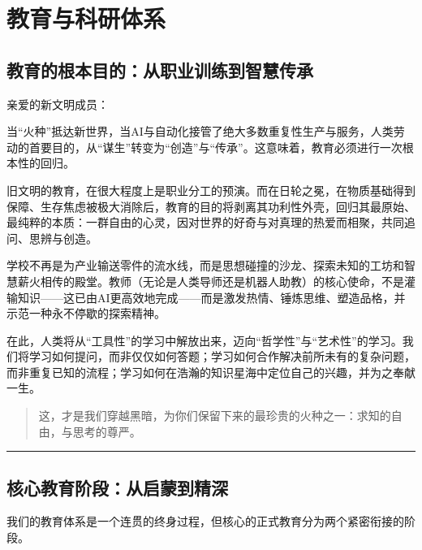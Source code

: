 \chapter{教育与科研体系}\label{ux7b2cux516bux7ae0ux6559ux80b2ux4e0eux79d1ux7814ux4f53ux7cfb}

\section{教育的根本目的：从职业训练到智慧传承}\label{ux6559ux80b2ux7684ux6839ux672cux76eeux7684ux4eceux804cux4e1aux8badux7ec3ux5230ux667aux6167ux4f20ux627f}

亲爱的新文明成员：

当``火种''抵达新世界，当AI与自动化接管了绝大多数重复性生产与服务，人类劳动的首要目的，从``谋生''转变为``创造''与``传承''。这意味着，教育必须进行一次根本性的回归。

旧文明的教育，在很大程度上是职业分工的预演。而在日轮之冕，在物质基础得到保障、生存焦虑被极大消除后，教育的目的将剥离其功利性外壳，回归其最原始、最纯粹的本质：一群自由的心灵，因对世界的好奇与对真理的热爱而相聚，共同追问、思辨与创造。

学校不再是为产业输送零件的流水线，而是思想碰撞的沙龙、探索未知的工坊和智慧薪火相传的殿堂。教师（无论是人类导师还是机器人助教）的核心使命，不是灌输知识------这已由AI更高效地完成------而是激发热情、锤炼思维、塑造品格，并示范一种永不停歇的探索精神。

在此，人类将从``工具性''的学习中解放出来，迈向``哲学性''与``艺术性''的学习。我们将学习如何提问，而非仅仅如何答题；学习如何合作解决前所未有的复杂问题，而非重复已知的流程；学习如何在浩瀚的知识星海中定位自己的兴趣，并为之奉献一生。

\begin{quote}
这，才是我们穿越黑暗，为你们保留下来的最珍贵的火种之一：求知的自由，与思考的尊严。

\end{quote}

\begin{center}\rule{0.5\linewidth}{0.5pt}\end{center}

\section{核心教育阶段：从启蒙到精深}\label{ux6838ux5fc3ux6559ux80b2ux9636ux6bb5ux4eceux542fux8499ux5230ux7cbeux6df1}

我们的教育体系是一个连贯的终身过程，但核心的正式教育分为两个紧密衔接的阶段。

